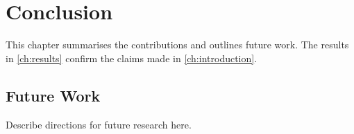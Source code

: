 \chapter{Conclusion}
\label{ch:conclusion}

This chapter summarises the contributions and outlines future work. The results in
\cref{ch:results} confirm the claims made in \cref{ch:introduction}.

\section{Future Work}
\label{sec:future-work}

Describe directions for future research here.
